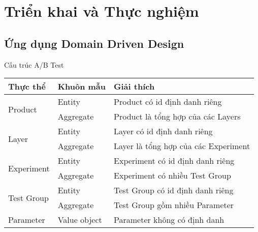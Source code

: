 \section{Triển khai và Thực nghiệm}

\subsection{Ứng dụng Domain Driven Design}

\begin{frame}{Cấu trúc A/B Test}
	\begin{table}
		\begin{tabular}{|l|l|l|}
			\hline
			Thực thể                    & Khuôn mẫu    & Giải thích                           \\ \hline
			\multirow{2}{*}{Product}    & Entity       & Product có id định danh riêng        \\ \cline{2-3}
			                            & Aggregate    & Product là tổng hợp của các Layers   \\ \hline
			\multirow{2}{*}{Layer}      & Entity       & Layer có id định danh riêng          \\ \cline{2-3}
			                            & Aggregate    & Layer là tổng hợp của các Experiment \\ \hline
			\multirow{2}{*}{Experiment} & Entity       & Experiment có id định danh riêng     \\ \cline{2-3}
			                            & Aggregate    & Experiment có nhiều Test Group       \\ \hline
			\multirow{2}{*}{Test Group} & Entity       & Test Group có id định danh riêng     \\ \cline{2-3}
			                            & Aggregate    & Test Group gồm nhiều Parameter       \\ \hline
			Parameter                   & Value object & Parameter không có định danh         \\ \hline
		\end{tabular}
	\end{table}
\end{frame}

